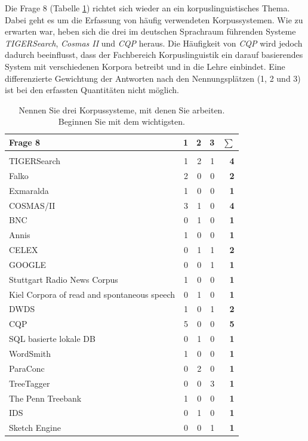 Die Frage 8 (Tabelle \ref{tab:Frage8}) richtet sich wieder an ein korpuslinguistisches Thema. Dabei geht es um die Erfassung von häufig verwendeten Korpussystemen. Wie zu erwarten war, heben sich die drei im deutschen Sprachraum führenden Systeme \emph{TIGERSearch}, \emph{Cosmas II} und \emph{CQP} heraus. Die Häufigkeit von \emph{CQP} wird jedoch dadurch beeinflusst, dass der Fachbereich Korpuslinguistik ein darauf basierendes System mit verschiedenen Korpora betreibt und in die Lehre einbindet. Eine differenzierte Gewichtung der Antworten nach den Nennungsplätzen (1, 2 und 3) ist bei den erfassten Quantitäten nicht möglich.


	\begin{table}[H]
		\centering
		\begin{tabular}{l | r r r r}
			 		Frage 8 & 1 & 2 & 3 & \bf{$\sum$}\\
					\hline\\
					
					TIGERSearch 	& 1 & 2 & 1 & \bf{4} \\
					Falko		& 2 & 0 & 0 & \bf{2} \\
					Exmaralda	& 1 & 0 & 0 & \bf{1} \\
					COSMAS/II	& 3 & 1 & 0 & \bf{4} \\
					BNC			& 0 & 1 & 0 & \bf{1} \\
					Annis		& 1 & 0 & 0 & \bf{1} \\
					CELEX		& 0 & 1 & 1 & \bf{2} \\
					GOOGLE		& 0 & 0 & 1 & \bf{1} \\
					Stuttgart Radio 
					News Corpus	& 1 & 0 & 0 & \bf{1} \\
					Kiel Corpora of 
					read and 
					spontaneous 
					speech		& 0 & 1 & 0 & \bf{1} \\
					DWDS		& 1 & 0 & 1 & \bf{2} \\
					CQP			& 5 & 0 & 0 & \bf{5} \\
					SQL basierte 
					lokale DB		& 0 & 1 & 0 & \bf{1} \\
					WordSmith	& 1 & 0 & 0 & \bf{1} \\
					ParaConc		& 0 & 2 & 0 & \bf{1} \\
					TreeTagger	& 0 & 0 & 3 & \bf{1} \\
					The Penn 
					Treebank		& 1 & 0 & 0 & \bf{1} \\
					IDS			& 0 & 1 & 0 & \bf{1} \\
					Sketch Engine	& 0 & 0 & 1 & \bf{1}			
		\end{tabular}
		\caption{Nennen Sie drei Korpussysteme, mit denen Sie arbeiten. Beginnen Sie mit dem wichtigsten.}\label{tab:Frage8}
	\end{table}

